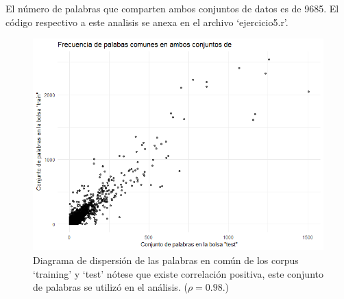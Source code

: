 \documentclass[paper=letter, fontsize=11pt]{scrartcl}
\numberwithin{equation}{section} %
\numberwithin{figure}{section} %
\numberwithin{table}{section} %
\begin{document}
El número de palabras que comparten ambos conjuntos de datos es de 9685. El código respectivo a este analisis se anexa en el archivo ‘ejercicio5.r’.\\
\begin{figure}[H]
  \begin{center}
    \includegraphics[scale=.6]{palabras1.png}
    \caption{Diagrama de dispersión de las palabras en común de los corpus ‘training’ y ‘test’ nótese que existe correlación positiva, este conjunto de palabras se utilizó en el análisis. ($\rho=0.98$.)}
    \label{figura5_1}
  \end{center}
\end{figure}
\FloatBarrier
\end{document}

